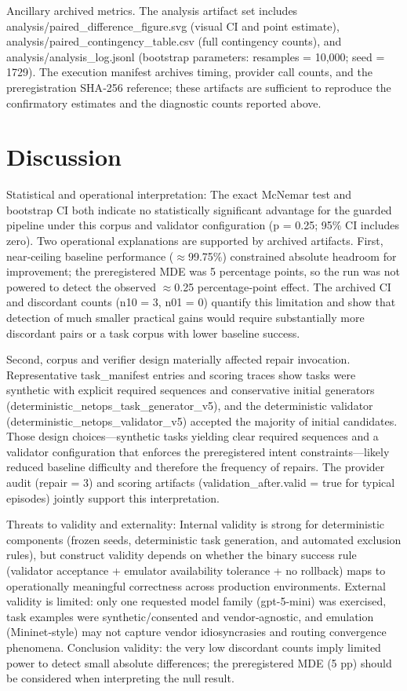 \documentclass[conference]{IEEEtran}
\begin{document}
Ancillary archived metrics. The analysis artifact set includes analysis/paired\_difference\_figure.svg (visual CI and point estimate), analysis/paired\_contingency\_table.csv (full contingency counts), and analysis/analysis\_log.jsonl (bootstrap parameters: resamples = 10,000; seed = 1729). The execution manifest archives timing, provider call counts, and the preregistration SHA‑256 reference; these artifacts are sufficient to reproduce the confirmatory estimates and the diagnostic counts reported above.

\section{Discussion}
Statistical and operational interpretation: The exact McNemar test and bootstrap CI both indicate no statistically significant advantage for the guarded pipeline under this corpus and validator configuration (p = 0.25; 95\% CI includes zero). Two operational explanations are supported by archived artifacts. First, near‑ceiling baseline performance (\ensuremath{\approx}99.75\%) constrained absolute headroom for improvement; the preregistered MDE was 5 percentage points, so the run was not powered to detect the observed \ensuremath{\approx}0.25 percentage‑point effect. The archived CI and discordant counts (n10 = 3, n01 = 0) quantify this limitation and show that detection of much smaller practical gains would require substantially more discordant pairs or a task corpus with lower baseline success.

Second, corpus and verifier design materially affected repair invocation. Representative task\_manifest entries and scoring traces show tasks were synthetic with explicit required sequences and conservative initial generators (deterministic\_netops\_task\_generator\_v5), and the deterministic validator (deterministic\_netops\_validator\_v5) accepted the majority of initial candidates. Those design choices---synthetic tasks yielding clear required sequences and a validator configuration that enforces the preregistered intent constraints---likely reduced baseline difficulty and therefore the frequency of repairs. The provider audit (repair = 3) and scoring artifacts (validation\_after.valid = true for typical episodes) jointly support this interpretation.

Threats to validity and externality: Internal validity is strong for deterministic components (frozen seeds, deterministic task generation, and automated exclusion rules), but construct validity depends on whether the binary success rule (validator acceptance + emulator availability tolerance + no rollback) maps to operationally meaningful correctness across production environments. External validity is limited: only one requested model family (gpt-5-mini) was exercised, task examples were synthetic/consented and vendor‑agnostic, and emulation (Mininet‑style) may not capture vendor idiosyncrasies and routing convergence phenomena. Conclusion validity: the very low discordant counts imply limited power to detect small absolute differences; the preregistered MDE (5 pp) should be considered when interpreting the null result.
\end{document}
